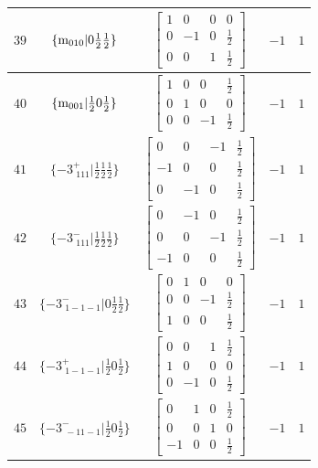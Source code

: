 \documentclass[fleqn,8pt]{jsarticle}
\begin{document}
\begin{longtable}{ccccc}
$ 39 $ & $ \{{\rm m}_{010}|0 \frac{1}{2} \frac{1}{2}\} $ & $ \begin{bmatrix} 1 & 0 & 0 & 0 \\ 0 & -1 & 0 & \frac{1}{2} \\ 0 & 0 & 1 & \frac{1}{2} \end{bmatrix} $ & $ -1 $ & $ 1 $ \\ \hline
$ 40 $ & $ \{{\rm m}_{001}|\frac{1}{2} 0 \frac{1}{2}\} $ & $ \begin{bmatrix} 1 & 0 & 0 & \frac{1}{2} \\ 0 & 1 & 0 & 0 \\ 0 & 0 & -1 & \frac{1}{2} \end{bmatrix} $ & $ -1 $ & $ 1 $ \\ \hline
$ 41 $ & $ \{-3^{+}_{\,\,111}|\frac{1}{2} \frac{1}{2} \frac{1}{2}\} $ & $ \begin{bmatrix} 0 & 0 & -1 & \frac{1}{2} \\ -1 & 0 & 0 & \frac{1}{2} \\ 0 & -1 & 0 & \frac{1}{2} \end{bmatrix} $ & $ -1 $ & $ 1 $ \\ \hline
$ 42 $ & $ \{-3^{-}_{\,\,111}|\frac{1}{2} \frac{1}{2} \frac{1}{2}\} $ & $ \begin{bmatrix} 0 & -1 & 0 & \frac{1}{2} \\ 0 & 0 & -1 & \frac{1}{2} \\ -1 & 0 & 0 & \frac{1}{2} \end{bmatrix} $ & $ -1 $ & $ 1 $ \\ \hline
$ 43 $ & $ \{-3^{-}_{\,\,1-1-1}|0 \frac{1}{2} \frac{1}{2}\} $ & $ \begin{bmatrix} 0 & 1 & 0 & 0 \\ 0 & 0 & -1 & \frac{1}{2} \\ 1 & 0 & 0 & \frac{1}{2} \end{bmatrix} $ & $ -1 $ & $ 1 $ \\ \hline
$ 44 $ & $ \{-3^{+}_{\,\,1-1-1}|\frac{1}{2} 0 \frac{1}{2}\} $ & $ \begin{bmatrix} 0 & 0 & 1 & \frac{1}{2} \\ 1 & 0 & 0 & 0 \\ 0 & -1 & 0 & \frac{1}{2} \end{bmatrix} $ & $ -1 $ & $ 1 $ \\ \hline
$ 45 $ & $ \{-3^{-}_{\,\,-11-1}|\frac{1}{2} 0 \frac{1}{2}\} $ & $ \begin{bmatrix} 0 & 1 & 0 & \frac{1}{2} \\ 0 & 0 & 1 & 0 \\ -1 & 0 & 0 & \frac{1}{2} \end{bmatrix} $ & $ -1 $ & $ 1 $ \\ \hline

\end{longtable}
\end{document}
